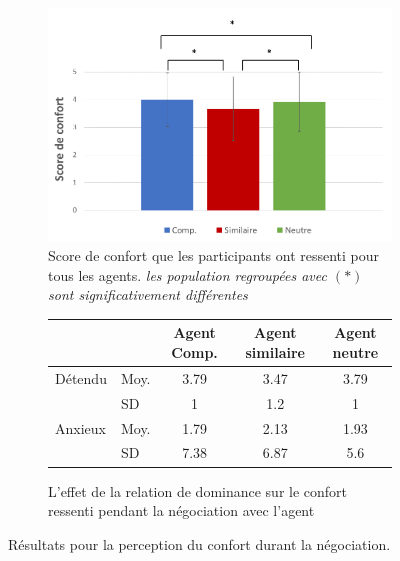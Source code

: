 	
		\begin{figure}[h]
			
			\begin{subfigure}[h]{0.8\textwidth}
				\centering
				\includegraphics[clip=false]{Figures/chap7/confort.PNG}
				\caption{ Score de confort que les participants ont ressenti pour tous les agents. \textit{les population regroupées avec $(*)$ sont significativement différentes }}
			\end{subfigure}
			
			\begin{subfigure}[h]{0.8\textwidth}
				\centering
				 \begin{tabular}{ l l c c c  }
				 	\hline
				 	\textbf{ }& & \textbf{Agent Comp.} & \textbf{Agent similaire} & \textbf{Agent neutre} \\ 
				 	\hline
				 	\newline \newline\multirow{2}{*} {Détendu} & Moy. &3.79 & 3.47 & 3.79 \\
				 	\newline  & SD & 1 & 1.2 & 1 \\
				 	\hline
				 	
				 	\newline \newline\multirow{2}{*} {Anxieux} & Moy. & 1.79 & 2.13 & 1.93 \\
				 	\newline  & SD & 7.38 & 6.87 & 5.6 \\
				 	\hline
				 \end{tabular}
			 	\caption{L'effet de la relation de dominance sur le confort ressenti pendant la négociation avec l'agent} 
			\end{subfigure}
			\caption{Résultats pour la perception du confort durant la négociation.}
			\label{tab:confort}
		\end{figure}	
	\vspace{- 1 em}
	
